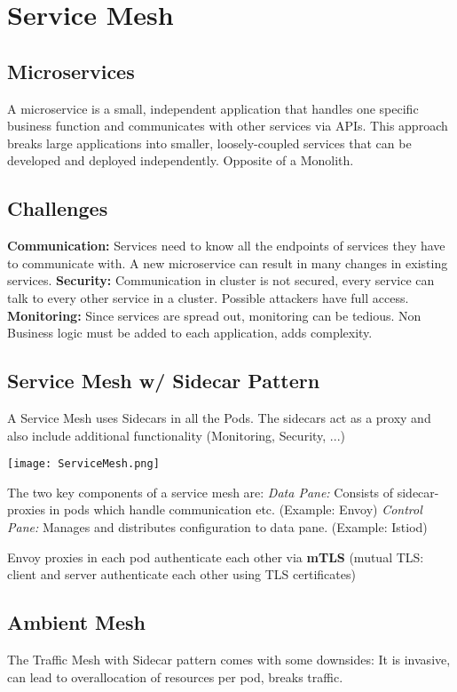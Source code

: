 \section{Service Mesh}
\subsection{Microservices}
A microservice is a small, independent application that handles one specific business function and communicates with other services via APIs. This approach breaks large applications into smaller, loosely-coupled services that can be developed and deployed independently. Opposite of a Monolith.
\subsection{Challenges}
\textbf{Communication:} Services need to know all the endpoints of services they have to communicate with. A new microservice can result in many changes in existing services.
\textbf{Security:} Communication in cluster is not secured, every service can talk to every other service in a cluster. Possible attackers have full access.
\textbf{Monitoring:} Since services are spread out, monitoring can be tedious. Non Business logic must be added to each application, adds complexity.
\subsection{Service Mesh w/ Sidecar Pattern}
A Service Mesh uses Sidecars in all the Pods. The sidecars act as a proxy and also include additional functionality (Monitoring, Security, ...)


\texttt{[image: ServiceMesh.png]}

The two key components of a service mesh are:
\textit{Data Pane:} Consists of sidecar-proxies in pods which handle communication etc. (Example: Envoy)
\textit{Control Pane:} Manages and distributes configuration to data pane. (Example: Istiod)

Envoy proxies in each pod authenticate each other via \textbf{mTLS} (mutual TLS: client and server authenticate each other using TLS certificates)

\subsection{Ambient Mesh}
The Traffic Mesh with Sidecar pattern comes with some downsides: It is invasive, can lead to overallocation of resources per pod, breaks traffic.

